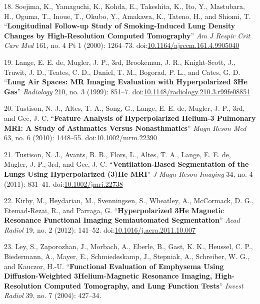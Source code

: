 \documentclass[11pt,]{article}
\begin{document}
\hypertarget{ref-Soejima:2000aa}{}
18. Soejima, K., Yamaguchi, K., Kohda, E., Takeshita, K., Ito, Y.,
Mastubara, H., Oguma, T., Inoue, T., Okubo, Y., Amakawa, K., Tateno, H.,
and Shiomi, T. ``\textbf{Longitudinal Follow-up Study of Smoking-Induced
Lung Density Changes by High-Resolution Computed Tomography}'' \emph{Am
J Respir Crit Care Med} 161, no. 4 Pt 1 (2000): 1264--73.
doi:\href{https://doi.org/10.1164/ajrccm.161.4.9905040}{10.1164/ajrccm.161.4.9905040}

\hypertarget{ref-Lange:1999aa}{}
19. Lange, E. E. de, Mugler, J. P., 3rd, Brookeman, J. R., Knight-Scott,
J., Truwit, J. D., Teates, C. D., Daniel, T. M., Bogorad, P. L., and
Cates, G. D. ``\textbf{Lung Air Spaces: MR Imaging Evaluation with
Hyperpolarized 3He Gas}'' \emph{Radiology} 210, no. 3 (1999): 851--7.
doi:\href{https://doi.org/10.1148/radiology.210.3.r99fe08851}{10.1148/radiology.210.3.r99fe08851}

\hypertarget{ref-Tustison:2010aa}{}
20. Tustison, N. J., Altes, T. A., Song, G., Lange, E. E. de, Mugler, J.
P., 3rd, and Gee, J. C. ``\textbf{Feature Analysis of Hyperpolarized
Helium-3 Pulmonary MRI: A Study of Asthmatics Versus Nonasthmatics}''
\emph{Magn Reson Med} 63, no. 6 (2010): 1448--55.
doi:\href{https://doi.org/10.1002/mrm.22390}{10.1002/mrm.22390}

\hypertarget{ref-Tustison:2011aa}{}
21. Tustison, N. J., Avants, B. B., Flors, L., Altes, T. A., Lange, E.
E. de, Mugler, J. P., 3rd, and Gee, J. C. ``\textbf{Ventilation-Based
Segmentation of the Lungs Using Hyperpolarized (3)He MRI}'' \emph{J Magn
Reson Imaging} 34, no. 4 (2011): 831--41.
doi:\href{https://doi.org/10.1002/jmri.22738}{10.1002/jmri.22738}

\hypertarget{ref-Kirby:2012aa}{}
22. Kirby, M., Heydarian, M., Svenningsen, S., Wheatley, A., McCormack,
D. G., Etemad-Rezai, R., and Parraga, G. ``\textbf{Hyperpolarized 3He
Magnetic Resonance Functional Imaging Semiautomated Segmentation}''
\emph{Acad Radiol} 19, no. 2 (2012): 141--52.
doi:\href{https://doi.org/10.1016/j.acra.2011.10.007}{10.1016/j.acra.2011.10.007}

\hypertarget{ref-Ley:2004aa}{}
23. Ley, S., Zaporozhan, J., Morbach, A., Eberle, B., Gast, K. K.,
Heussel, C. P., Biedermann, A., Mayer, E., Schmiedeskamp, J., Stepniak,
A., Schreiber, W. G., and Kauczor, H.-U. ``\textbf{Functional Evaluation
of Emphysema Using Diffusion-Weighted 3Helium-Magnetic Resonance
Imaging, High-Resolution Computed Tomography, and Lung Function Tests}''
\emph{Invest Radiol} 39, no. 7 (2004): 427--34.
\end{document}
